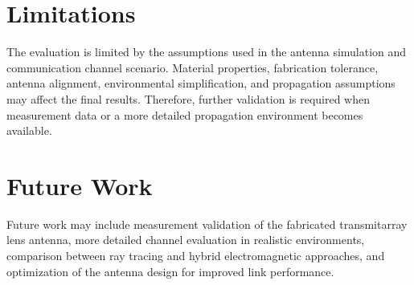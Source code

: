 \section{Limitations}
The evaluation is limited by the assumptions used in the antenna simulation and communication channel scenario. Material properties, fabrication tolerance, antenna alignment, environmental simplification, and propagation assumptions may affect the final results. Therefore, further validation is required when measurement data or a more detailed propagation environment becomes available.

\section{Future Work}
Future work may include measurement validation of the fabricated transmitarray lens antenna, more detailed channel evaluation in realistic environments, comparison between ray tracing and hybrid electromagnetic approaches, and optimization of the antenna design for improved link performance.

\newpage
\mbox{}
\newpage
